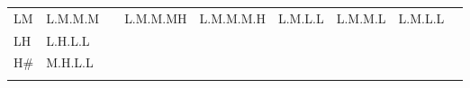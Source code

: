 \begin{subtables}
\begin{table}
{{\begin{tabularx}{\textwidth}{ l P{16mm} Q Q P{19mm} P{15mm} Q P{23mm} P{16mm} }
	LM & L.M.M.M & \hspace*{\fill} & L.M.M.MH & L.M.M.M.H & L.M.L.L & L.M.M.L & L.M.L.L & \hspace*{\fill}\\
	LH & L.H.L.L &  &  &  &  &  &  & \hspace*{\fill}\\
	H\# & M.H.L.L &  &  &  &  &  &  &
   \hspace*{\fill}\\
\lspbottomrule
\end{tabularx}}
}
\end{table}


\end{subtables}
